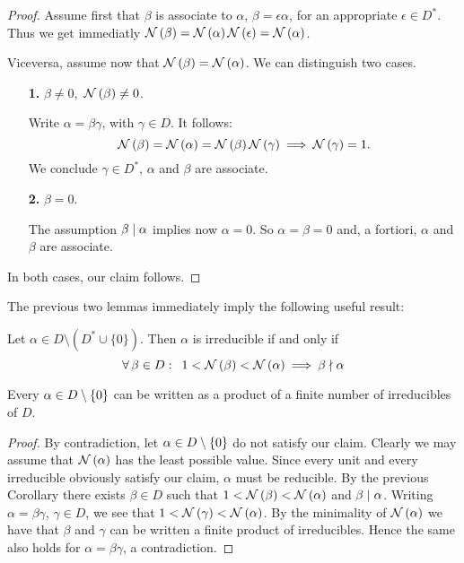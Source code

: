 \begin{proof}
%
Assume first that $\beta$ is associate to $\alpha$, \ie
$\beta=\epsilon \alpha$, for an appropriate
$\epsilon\in D^\ast$. Thus we get immediatly
$\mathcal{N}\left(\beta\right) = \mathcal{N}\left(\alpha\right)\mathcal{N}\left(\epsilon\right) =
\mathcal{N}\left(\alpha\right)$.

Viceversa, assume now that $\mathcal{N}\left(\beta\right) = \mathcal{N}\left(\alpha\right)$.
We can distinguish two cases.

\begin{enumerate}
%
\item[\textbf{1.}] $\beta \neq 0$,\, \ie\:$\mathcal{N}\left(\beta\right) \neq 0$.

Write $\alpha = \beta\gamma$, with $\gamma \in D$.
It follows:
$$
\mathcal{N}\left(\beta\right) = \mathcal{N}\left(\alpha\right) = \mathcal{N}\left(\beta\right)\mathcal{N}\left(\gamma\right)
\:\Longrightarrow\: \mathcal{N}\left(\gamma\right) = 1.
$$
We conclude $\gamma \in D^\ast$, \ie $\alpha$ and
$\beta$ are associate.
%
\item[\textbf{2.}] $\beta=0$.

The assumption $\beta \mid \alpha$ implies now
$\alpha=0$. So $\alpha = \beta = 0$ and, a fortiori,
$\alpha$ and $\beta$ are associate.
%
\end{enumerate}
%
In both cases, our claim follows.
\end{proof}

The previous two lemmas immediately imply the
following useful result:

\begin{cor} Let $\alpha\in D\setminus\left(D^\ast\cup\{0\}\right)$.
Then $\alpha$ is irreducible if and only if
\begin{equation*}
\forall\, \beta \in D:\enskip
1 < \mathcal{N}\left(\beta\right) < \mathcal{N}\left(\alpha\right)\:\Longrightarrow\:
\beta \nmid \alpha
\end{equation*}
\end{cor}

\begin{lem}\label{factorizationIntoIrreducibles}
Every $\alpha \in D\setminus\left\{0\right\}$ can be written as a
product of a finite number of irreducibles of $D$.
\end{lem}

\begin{proof}
%
By contradiction, let $\alpha \in D \setminus\left\{0\right\}$ do not
satisfy our claim. Clearly we may assume that
$\mathcal{N}\left(\alpha\right)$ has the least possible value. Since every
unit and every irreducible obviously satisfy our claim,
$\alpha$ must be reducible. By the previous Corollary
there exists $\beta\in D$ such that $1 < \mathcal{N}\left(\beta\right) <
\mathcal{N}\left(\alpha\right)$ and $\beta \mid \alpha$.
Writing $\alpha = \beta\gamma$, $\gamma \in D$, we see
that \mbox{$1 < \mathcal{N}\left(\gamma\right) < \mathcal{N}\left(\alpha\right)$}. By the
minimality of $\mathcal{N}\left(\alpha\right)$ we have that $\beta$ and
$\gamma$ can be written a finite product of irreducibles.
Hence the same also holds for $\alpha = \beta\gamma$, a
contradiction.
%
\end{proof}

